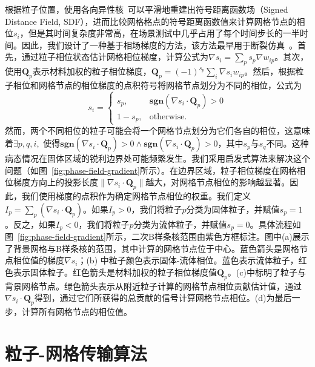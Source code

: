 根据粒子位置，使用各向异性核~\cite{yu2013reconstructing}可以平滑地重建出符号距离函数场（Signed Distance Field, SDF），进而比较网格格点的符号距离函数值来计算网格节点的相位$s_i$，但是其时间复杂度非常高，在场景测试中几乎占用了每个时间步长的一半时间。因此，我们设计了一种基于相场梯度的方法，该方法最早用于断裂仿真~\cite{homel2017field}。首先，通过粒子相位状态估计网格相位梯度，计算公式为$\nabla s_i = \sum_{p} s_p \nabla w_{ip}$。其次，使用$\mathbf{Q}_p$表示材料加权的粒子相位梯度，$\mathbf{Q}_p = (-1)^{s_p}\sum_{i} \nabla s_i w_{ip}$。然后，根据粒子相位和网格节点的相位梯度的点积符号将网格节点划分为不同的相位，公式为
\begin{equation}
s_{i}=
\begin{cases} 
s_p, &  \textbf{sgn}(\nabla s_i \cdot \mathbf{Q}_p) > 0 \\
1 - s_p, & \text{otherwise}.
\end{cases}
\end{equation}
然而，两个不同相位的粒子可能会将一个网格节点划分为它们各自的相位，这意味着$\exists p, q, i,$ 使得$\textbf{sgn}(\nabla s_i \cdot \mathbf{Q}_p) > 0 \land \textbf{sgn}(\nabla s_i \cdot \mathbf{Q}_p) > 0$，其中$s_p$与$s_q$不同。这种病态情况在固体区域的锐利边界处可能频繁发生。我们采用启发式算法来解决这个问题（如图~\ref{fig:phase-field-gradient}所示）。在边界区域，粒子相位梯度在网格相位梯度方向上的投影长度$\| \nabla s_i \cdot \mathbf{Q}_p \|$越大，对网格节点相位的影响越显著。因此，我们使用梯度的点积作为确定网格节点相位的权重。我们定义$I_p=\sum_{p}(\nabla s_i \cdot \mathbf{Q}_p)$。如果$I_p > 0$，我们将粒子$p$分类为固体粒子，并赋值$s_p=1$。反之，如果$I_p<0$，我们将粒子$p$分类为流体粒子，并赋值$s_p=0$。具体流程如图~\ref{fig:phase-field-gradient}所示，二次B样条核范围由紫色方框标注。图中(a)展示了背景网格与B样条核的范围，其中计算的网格节点位于中心。蓝色箭头是网格节点相位值的梯度$\nabla s_i$；(b) 中粒子颜色表示固体-流体相位。蓝色表示流体粒子，红色表示固体粒子。红色箭头是材料加权的粒子相位梯度值$\mathbf{Q}_p$。(c)中标明了粒子与背景网格节点。绿色箭头表示从附近粒子计算的网格节点相位贡献估计值，通过$\nabla s_i\cdot \mathbf{Q}_p$得到，通过它们所获得的总贡献的信号计算网格节点相位。(d)为最后一步，计算所有网格节点的相位值。




\section{粒子-网格传输算法}
